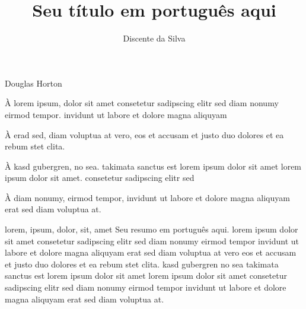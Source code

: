 \documentclass[portuguese,oneside]{pucrs-ppgcc}
\author{Discente da Silva}
\title{Seu título em português aqui}
      {Your title in english here}
\begin{document}

         {Douglas Horton}


\begin{agradecimentos}
À lorem ipsum, dolor sit amet consetetur sadipscing elitr sed diam
nonumy eirmod tempor. invidunt ut labore et dolore magna aliquyam

À erad sed, diam voluptua at vero, eos et accusam et justo duo
dolores et ea rebum stet clita.

À kasd gubergren, no sea. takimata sanctus est lorem ipsum dolor sit
amet lorem ipsum dolor sit amet. consetetur sadipscing elitr sed

À diam nonumy, eirmod tempor, invidunt ut labore et dolore magna
aliquyam erat sed diam voluptua at.
\end{agradecimentos}

\begin{resumo}{lorem, ipsum, dolor, sit, amet}
Seu resumo em português aqui. lorem ipsum dolor sit amet
consetetur sadipscing elitr sed diam nonumy eirmod tempor invidunt
ut labore et dolore magna aliquyam erat sed diam voluptua at vero
eos et accusam et justo duo dolores et ea rebum stet clita.  kasd
gubergren no sea takimata sanctus est lorem ipsum dolor sit amet
lorem ipsum dolor sit amet consetetur sadipscing elitr sed diam
nonumy eirmod tempor invidunt ut labore et dolore magna aliquyam
erat sed diam voluptua at.
\end{resumo}
\end{document}
